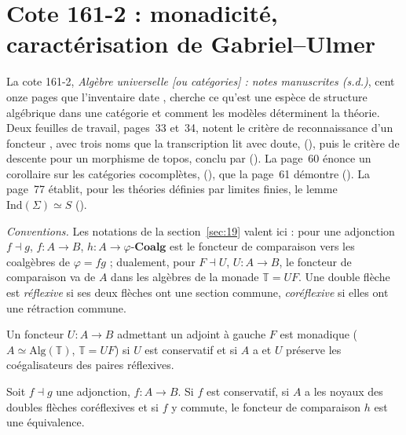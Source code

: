 \section[Cote 161-2 : monadicité, caractérisation de Gabriel--Ulmer]{Cote 161-2 : monadicité, caractérisation de Gabriel--Ulmer\protect{}}\label{sec:161-2}

La cote 161-2, \emph{Algèbre universelle [ou catégories] : notes manuscrites (s.d.)}, cent onze pages que l'inventaire date \q{[vers 1963-1973]}, cherche ce qu'est une espèce de structure algébrique dans une catégorie et comment les modèles déterminent la théorie. Deux feuilles de travail, pages~33 et~34, notent le critère de reconnaissance d'un foncteur , avec trois noms que la transcription lit avec doute,  (), puis le critère de descente pour un morphisme de topos, conclu par  (). La page~60 énonce un corollaire sur les catégories cocomplètes,  (), que la page~61 démontre (). La page~77 établit, pour les théories définies par limites finies, le lemme $\mathrm{Ind}(\Sigma) \simeq S$ ().

\noindent\emph{Conventions.} Les notations de la section~\ref{sec:19} valent ici : pour une adjonction $f \dashv g$, $f : A \to B$, $h : A \to \varphi\text{-}\mathbf{Coalg}$ est le foncteur de comparaison vers les coalgèbres de $\varphi = fg$ ; dualement, pour $F \dashv U$, $U : A \to B$, le foncteur de comparaison va de $A$ dans les algèbres de la monade $\mathbb T = UF$. Une double flèche est \emph{réflexive} si ses deux flèches ont une section commune, \emph{coréflexive} si elles ont une rétraction commune.

\begin{enonce}
Un foncteur $U : A \to B$ admettant un adjoint à gauche $F$ est monadique ($A \simeq \mathrm{Alg}(\mathbb T)$, $\mathbb T = UF$) si $U$ est conservatif et si $A$ a et $U$ préserve les coégalisateurs des paires réflexives.
\end{enonce}

\begin{lemme}\label{lem:161-2-grossier}
Soit $f \dashv g$ une adjonction, $f : A \to B$. Si $f$ est conservatif, si $A$ a les noyaux des doubles flèches coréflexives et si $f$ y commute, le foncteur de comparaison $h$ est une équivalence.
\end{lemme}

